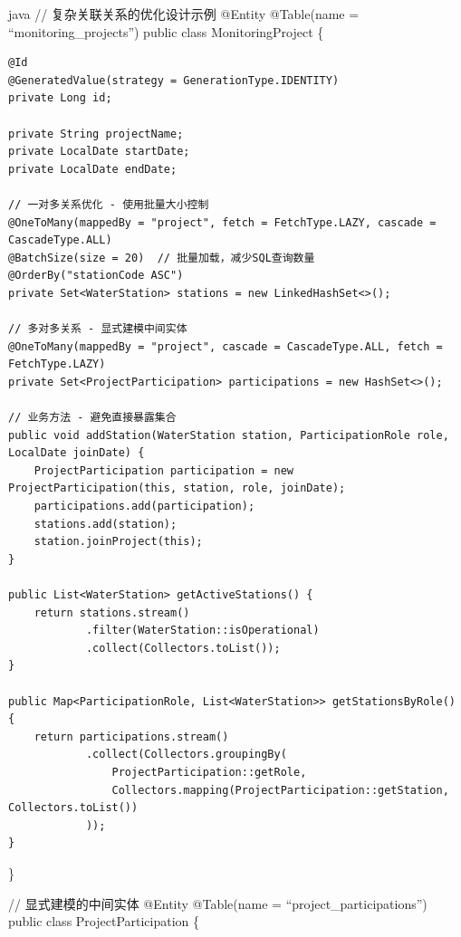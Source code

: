java // 复杂关联关系的优化设计示例 @Entity @Table(name = ``monitoring\_projects'') public class MonitoringProject \{

\begin{verbatim}
@Id
@GeneratedValue(strategy = GenerationType.IDENTITY)
private Long id;

private String projectName;
private LocalDate startDate;
private LocalDate endDate;

// 一对多关系优化 - 使用批量大小控制
@OneToMany(mappedBy = "project", fetch = FetchType.LAZY, cascade = CascadeType.ALL)
@BatchSize(size = 20)  // 批量加载，减少SQL查询数量
@OrderBy("stationCode ASC")
private Set<WaterStation> stations = new LinkedHashSet<>();

// 多对多关系 - 显式建模中间实体
@OneToMany(mappedBy = "project", cascade = CascadeType.ALL, fetch = FetchType.LAZY)
private Set<ProjectParticipation> participations = new HashSet<>();

// 业务方法 - 避免直接暴露集合
public void addStation(WaterStation station, ParticipationRole role, LocalDate joinDate) {
    ProjectParticipation participation = new ProjectParticipation(this, station, role, joinDate);
    participations.add(participation);
    stations.add(station);
    station.joinProject(this);
}

public List<WaterStation> getActiveStations() {
    return stations.stream()
            .filter(WaterStation::isOperational)
            .collect(Collectors.toList());
}

public Map<ParticipationRole, List<WaterStation>> getStationsByRole() {
    return participations.stream()
            .collect(Collectors.groupingBy(
                ProjectParticipation::getRole,
                Collectors.mapping(ProjectParticipation::getStation, Collectors.toList())
            ));
}
\end{verbatim}

\}

// 显式建模的中间实体 @Entity @Table(name = ``project\_participations'') public class ProjectParticipation \{


